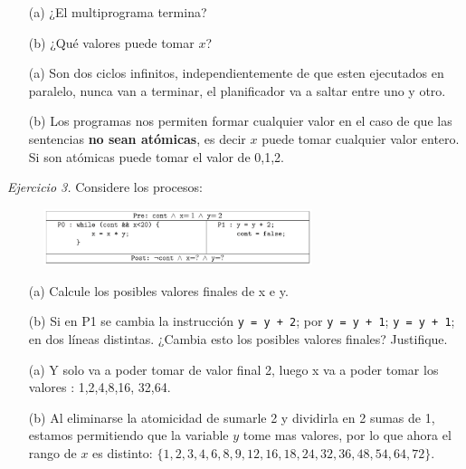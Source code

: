 \documentclass[12pt]{article}
\begin{document}
\begin{itemize}
    \item[(a)] ¿El multiprograma termina?
    \item[(b)] ¿Qué valores puede tomar $x$?
\end{itemize}

\begin{rta}
    \begin{itemize}
        \item[(a)] Son dos ciclos infinitos, independientemente de que esten ejecutados en paralelo, nunca van a terminar, el planificador va a saltar entre uno y otro.
        \item[(b)] Los programas nos permiten formar cualquier valor en el caso de que las sentencias \textbf{no sean atómicas}, es decir $x$ puede tomar cualquier valor entero. Si son atómicas puede tomar el valor de 0,1,2.
    \end{itemize}
\end{rta}

\noindent \textit{Ejercicio 3.} Considere los procesos:

\begin{figure}[h]
    \centering
    \includegraphics[width=0.7\textwidth]{c3.png}
\end{figure}

\begin{itemize}
    \item[(a)] Calcule los posibles valores finales de x e y.
    \item[(b)] Si en P1 se cambia la instrucción \texttt{y = y + 2}; por \texttt{y = y + 1}; \texttt{y = y + 1}; en dos líneas distintas. ¿Cambia esto los posibles valores finales? Justifique.    
\end{itemize}

\begin{rta}
    \begin{itemize}
        \item[(a)] Y solo va a poder tomar de valor final 2, luego x va a poder tomar los valores : 1,2,4,8,16, 32,64.
        \item[(b)] Al eliminarse la atomicidad de sumarle 2 y dividirla en 2 sumas de 1, estamos permitiendo que la variable $y$ tome mas valores, por lo que ahora el rango de $x$ es distinto: $\{1,2,3,4,6,8,9,12,16,18,24,32,36,48,54,64,72\}$.
    \end{itemize}
\end{rta}
\end{document}
